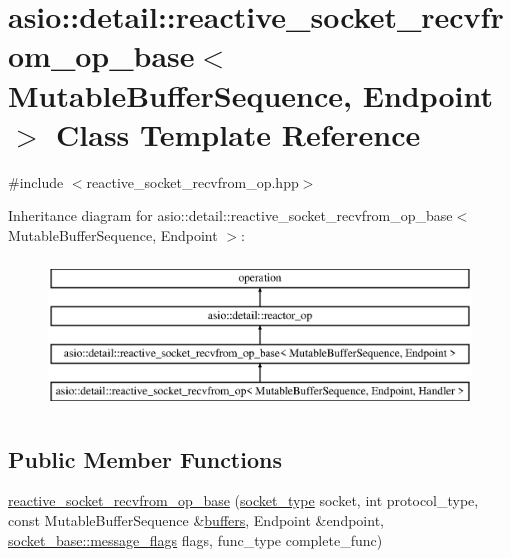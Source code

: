 \hypertarget{classasio_1_1detail_1_1reactive__socket__recvfrom__op__base}{}\section{asio\+:\+:detail\+:\+:reactive\+\_\+socket\+\_\+recvfrom\+\_\+op\+\_\+base$<$ Mutable\+Buffer\+Sequence, Endpoint $>$ Class Template Reference}
\label{classasio_1_1detail_1_1reactive__socket__recvfrom__op__base}


{\ttfamily \#include $<$reactive\+\_\+socket\+\_\+recvfrom\+\_\+op.\+hpp$>$}

Inheritance diagram for asio\+:\+:detail\+:\+:reactive\+\_\+socket\+\_\+recvfrom\+\_\+op\+\_\+base$<$ Mutable\+Buffer\+Sequence, Endpoint $>$\+:\begin{figure}[H]
\begin{center}
\leavevmode
\includegraphics[height=4.000000cm]{classasio_1_1detail_1_1reactive__socket__recvfrom__op__base}
\end{center}
\end{figure}
\subsection*{Public Member Functions}
\begin{DoxyCompactItemize}
\item 
\hyperlink{classasio_1_1detail_1_1reactive__socket__recvfrom__op__base_a19f1ee615567314a7c4ae94dbd9c24da}{reactive\+\_\+socket\+\_\+recvfrom\+\_\+op\+\_\+base} (\hyperlink{namespaceasio_1_1detail_a6798c771dd84b79798b1a08150706ea9}{socket\+\_\+type} socket, int protocol\+\_\+type, const Mutable\+Buffer\+Sequence \&\hyperlink{group__async__read_ga54dede45c3175148a77fe6635222c47d}{buffers}, Endpoint \&endpoint, \hyperlink{classasio_1_1socket__base_ac3cf77465dfedfe1979b5415cf32cc94}{socket\+\_\+base\+::message\+\_\+flags} flags, func\+\_\+type complete\+\_\+func)
\end{DoxyCompactItemize}
